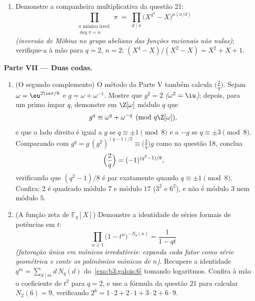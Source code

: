 \begin{problem}
\begin{enumerate}[resume]
        números primos, com $\log x$ trocado por $n$; verifique
        numericamente para $q = 2$, $n \leq 4$ (o~\cref{exo:b3:galois:6} dá as
        contagens).
  \item Demonstre a companheira multiplicativa da questão 21:
        \[
        \prod_{\substack{\pi \text{ mônico irred.}\\ \deg\pi =
        n}}\pi \;=\; \prod_{d \mid n}
        \bigl(X^{q^d} - X\bigr)^{\mu(n/d)}
        \]
        \emph{(inversão de Möbius no grupo abeliano das funções
        racionais não nulas)}; verifique-a à mão para $q
        = 2$,
        $n = 2$: $(X^4 - X)/(X^2 - X) = X^2 + X + 1$.
\end{enumerate}

\medskip
\noindent\textbf{Parte VII --- Duas codas.}
\begin{enumerate}[resume]
  \item (O segundo complemento) O método da Parte V também calcula
        $\bigl(\frac2q\bigr)$. Sejam $\omega = \eu^{2\iu\pi/8}$ e $g = \omega + \omega^{-1}$. Mostre que $g^2 = 2$ \emph{($\omega^2 = \iu$)};
        depois, para um primo ímpar $q$, demonstre em $\Z[\omega]$ módulo
        $q$ que
        \[
        g^q \equiv \omega^q + \omega^{-q} \pmod{q\Z[\omega]},
        \]
        e que o lado direito é igual a $g$ se $q \equiv \pm1
        \pmod 8$ e a $-g$
        se $q \equiv \pm3 \pmod 8$. Comparando com $g^q = g\,(g^2)^{(q-1)/2} \equiv
        \bigl(\frac2q\bigr)g$ como na questão 18, conclua
        \[
        \Bigl(\frac2q\Bigr) = (-1)^{(q^2-1)/8},
        \]
        verificando que $(q^2 - 1)/8$ é par exatamente quando $q
        \equiv \pm1 \pmod 8$. Confira:
        $2$ é quadrado módulo $7$ e módulo $17$
        ($3^2$ e $6^2$), e não é módulo $3$ nem módulo
        $5$.
  \item (A função zeta de $\mathbb F_q[X]$) Demonstre a identidade de séries
        formais de potências em $t$:
        \[
        \prod_{n \geq 1}\bigl(1 - t^n\bigr)^{-N_q(n)}
        = \frac1{1 - qt}
        \]
        \emph{(fatoração única em mônicos irredutíveis: expanda cada
        fator como série geométrica e conte os polinômios mônicos de
         $n$)}. Recupere a identidade $q^m = \sum_{d \mid m}d\,N_q(d)$ do~\cref{exo:b3:galois:6}
        tomando logaritmos. Confira à mão o coeficiente de $t^2$
        para $q = 2$, e use a fórmula da questão 21 para calcular
        $N_2(6) = 9$, verificando $2^6 = 1\cdot2 + 2\cdot1 + 3\cdot2 +
        6\cdot9$.
\end{enumerate}
\end{problem}
